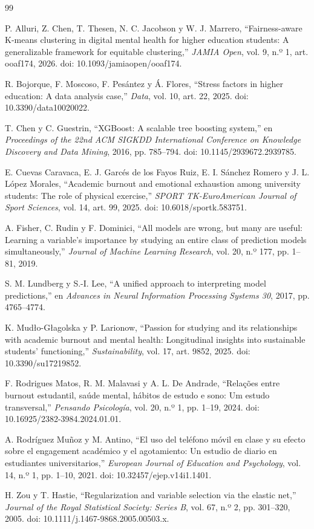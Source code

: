 \documentclass[11pt,a4paper]{article}
\begin{document}
\clearpage
\begin{thebibliography}{99}

P. Alluri, Z. Chen, T. Thesen, N. C. Jacobson y W. J. Marrero, ``Fairness-aware K-means clustering in digital mental health for higher education students: A generalizable framework for equitable clustering,'' \emph{JAMIA Open}, vol. 9, n.º 1, art. ooaf174, 2026. doi: 10.1093/jamiaopen/ooaf174.

R. Bojorque, F. Moscoso, F. Pesántez y Á. Flores, ``Stress factors in higher education: A data analysis case,'' \emph{Data}, vol. 10, art. 22, 2025. doi: 10.3390/data10020022.

T. Chen y C. Guestrin, ``XGBoost: A scalable tree boosting system,'' en \emph{Proceedings of the 22nd ACM SIGKDD International Conference on Knowledge Discovery and Data Mining}, 2016, pp. 785--794. doi: 10.1145/2939672.2939785.

E. Cuevas Caravaca, E. J. Garcés de los Fayos Ruiz, E. I. Sánchez Romero y J. L. López Morales, ``Academic burnout and emotional exhaustion among university students: The role of physical exercise,'' \emph{SPORT TK-EuroAmerican Journal of Sport Sciences}, vol. 14, art. 99, 2025. doi: 10.6018/sportk.583751.

A. Fisher, C. Rudin y F. Dominici, ``All models are wrong, but many are useful: Learning a variable's importance by studying an entire class of prediction models simultaneously,'' \emph{Journal of Machine Learning Research}, vol. 20, n.º 177, pp. 1--81, 2019.

S. M. Lundberg y S.-I. Lee, ``A unified approach to interpreting model predictions,'' en \emph{Advances in Neural Information Processing Systems 30}, 2017, pp. 4765--4774.

K. Mudło-Głagolska y P. Larionow, ``Passion for studying and its relationships with academic burnout and mental health: Longitudinal insights into sustainable students' functioning,'' \emph{Sustainability}, vol. 17, art. 9852, 2025. doi: 10.3390/su17219852.

F. Rodrigues Matos, R. M. Malavasi y A. L. De Andrade, ``Relações entre burnout estudantil, saúde mental, hábitos de estudo e sono: Um estudo transversal,'' \emph{Pensando Psicología}, vol. 20, n.º 1, pp. 1--19, 2024. doi: 10.16925/2382-3984.2024.01.01.

A. Rodríguez Muñoz y M. Antino, ``El uso del teléfono móvil en clase y su efecto sobre el engagement académico y el agotamiento: Un estudio de diario en estudiantes universitarios,'' \emph{European Journal of Education and Psychology}, vol. 14, n.º 1, pp. 1--10, 2021. doi: 10.32457/ejep.v14i1.1401.

H. Zou y T. Hastie, ``Regularization and variable selection via the elastic net,'' \emph{Journal of the Royal Statistical Society: Series B}, vol. 67, n.º 2, pp. 301--320, 2005. doi: 10.1111/j.1467-9868.2005.00503.x.

\end{thebibliography}
\end{document}
